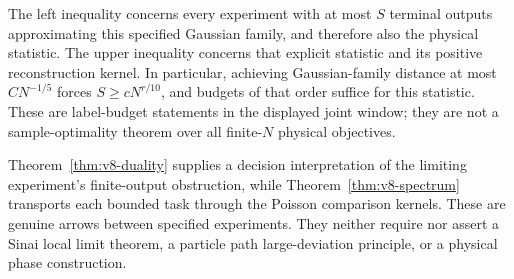 The left inequality concerns every experiment with at most $S$
terminal outputs approximating this specified Gaussian family, and
therefore also the physical statistic. The upper inequality concerns
that explicit statistic and its positive reconstruction kernel.
In particular, achieving Gaussian-family distance at most
$C N^{-1/5}$ forces $S\ge cN^{r/10}$, and budgets of that order suffice
for this statistic. These are label-budget statements in the displayed
joint window; they are not a sample-optimality theorem over all
finite-$N$ physical objectives.

Theorem~\ref{thm:v8-duality} supplies a decision interpretation of the
limiting experiment's finite-output obstruction, while
Theorem~\ref{thm:v8-spectrum} transports each bounded task through the
Poisson comparison kernels. These are genuine arrows between specified
experiments. They neither require nor assert a Sinai local limit theorem,
a particle path large-deviation principle, or a physical phase
construction.
